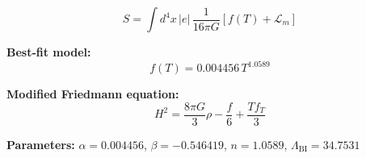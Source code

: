 
\begin{equation}
  S = \int d^4x \, |e| \, \frac{1}{16\pi G} \left[ f(T) + \mathcal{L}_m \right]
\end{equation}

\textbf{Best-fit model:}
\begin{equation}
  f(T) = 0.004456 \, T^{1.0589}
\end{equation}

\textbf{Modified Friedmann equation:}
\begin{equation}
  H^2 = \frac{8\pi G}{3} \rho - \frac{f}{6} + \frac{T f_T}{3}
\end{equation}

\textbf{Parameters:}
$\alpha = 0.004456$, \quad
$\beta = -0.546419$, \quad
$n = 1.0589$, \quad
$\Lambda_{\text{BI}} = 34.7531$